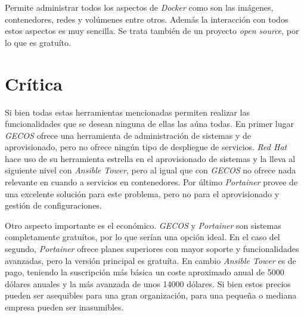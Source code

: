 \begin{itemize}
	Permite administrar todos los aspectos de \textit{Docker} como son las imágenes, contenedores, redes y volúmenes entre otros. Además la interacción con todos estos aspectos es muy sencilla. Se trata también de un proyecto \textit{open source}, por lo que es gratuíto.
\end{itemize}


\section{Crítica}

Si bien todas estas herramientas mencionadas permiten realizar las funcionalidades que se desean ninguna de ellas las aúna todas. En primer lugar \textit{GECOS} ofrece una herramienta de administración de sistemas y de aprovisionado, pero no ofrece ningún tipo de despliegue de servicios. \textit{Red Hat} hace uso de su herramienta estrella en el aprovisionado de sistemas y la lleva al siguiente nivel con \textit{Ansible Tower}, pero al igual que con \textit{GECOS} no ofrece nada relevante en cuando a servicios en contenedores. Por último \textit{Portainer} provee de una excelente solución para este problema, pero no para el aprovisionado y gestión de configuraciones.

Otro aspecto importante es el económico. \textit{GECOS} y \textit{Portainer} son sistemas completamente gratuítos, por lo que serían una opción ideal. En el caso del segundo, \textit{Portainer} ofrece planes superiores con mayor soporte y funcionalidades avanzadas, pero la versión principal es gratuíta. En cambio \textit{Ansible Tower} es de pago, teniendo la suscripción más básica un coste aproximado anual de 5000 dólares anuales y la más avanzada de unos 14000 dólares. Si bien estos precios pueden ser asequibles para una gran organización, para una pequeña o mediana empresa pueden ser inasumibles.
